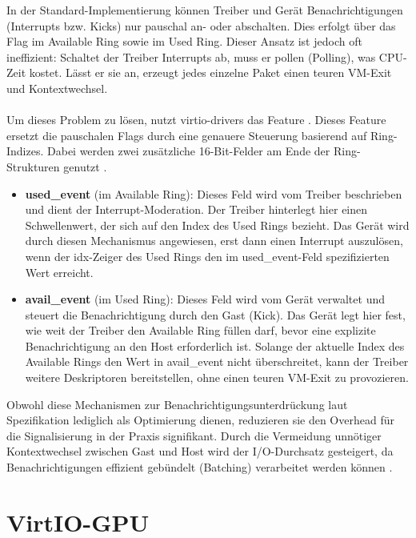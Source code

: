 In der Standard-Implementierung können Treiber und Gerät Benachrichtigungen (Interrupts bzw. Kicks) nur pauschal an- oder abschalten. Dies erfolgt über das Flag \allowbreak{} im Available Ring sowie  im Used Ring. Dieser Ansatz ist jedoch oft ineffizient: Schaltet der Treiber Interrupts ab, muss er pollen (Polling), was CPU-Zeit kostet. Lässt er sie an, erzeugt jedes einzelne Paket einen teuren VM-Exit und Kontextwechsel.\\
\\
Um dieses Problem zu lösen, nutzt virtio-drivers das Feature . Dieses Feature ersetzt die pauschalen Flags durch eine genauere Steuerung basierend auf Ring-Indizes. Dabei werden zwei zusätzliche 16-Bit-Felder am Ende der Ring-Strukturen genutzt \cite{RedHatvirtqueues}.

\begin{itemize}
 \item \textbf{used\_event} (im Available Ring): Dieses Feld wird vom Treiber beschrieben und dient der Interrupt-Moderation. Der Treiber hinterlegt hier einen Schwellenwert, der sich auf den Index des Used Rings bezieht. Das Gerät wird durch diesen Mechanismus angewiesen, erst dann einen Interrupt auszulösen, wenn der idx-Zeiger des Used Rings den im used\_event-Feld spezifizierten Wert erreicht.
 \item \textbf{avail\_event} (im Used Ring): Dieses Feld wird vom Gerät verwaltet und steuert die Benachrichtigung durch den Gast (Kick). Das Gerät legt hier fest, wie weit der Treiber den Available Ring füllen darf, bevor eine explizite Benachrichtigung an den Host erforderlich ist. Solange der aktuelle Index des Available Rings den Wert in avail\_event nicht überschreitet, kann der Treiber weitere Deskriptoren bereitstellen, ohne einen teuren VM-Exit zu provozieren.
\end{itemize}

Obwohl diese Mechanismen zur Benachrichtigungsunterdrückung laut Spezifikation lediglich als Optimierung dienen, reduzieren sie den Overhead für die Signalisierung in der Praxis signifikant. Durch die Vermeidung unnötiger Kontextwechsel zwischen Gast und Host wird der I/O-Durchsatz gesteigert, da Benachrichtigungen effizient gebündelt (Batching) verarbeitet werden können \cite[Abschnitt~2.7.7]{OASISVirtio12}.

\section{VirtIO-GPU}

